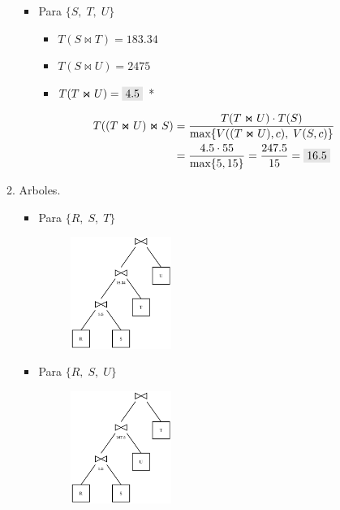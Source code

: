 \documentclass{templateNote}
\newcommand{\newparagraph}{\par\vspace{\baselineskip}\noindent}
\begin{document}
\begin{enumerate}
\begin{enumerate}[label=\arabic*)]
\begin{itemize}
            \item Para $\{S, \; T, \; U\}$
            \begin{itemize}
                \item $T(S \Join T) = 183.34$
                \item $T(S \Join U) = 2475$
                \item $T(T \Join U) = \colorbox{gray!20}{4.5}$ *
            \end{itemize}
            \begin{align*}
                T((T \Join U) \Join S) &= \displaystyle\frac{T(T \Join U) \cdot T(S)}{\text{max}\{V((T \Join U),c), \; V(S,c)\}} \\
                &= \frac{4.5 \cdot 55}{\text{max}\{5, 15\}} = \frac{247.5}{15} = \colorbox{gray!20}{16.5}
            \end{align*}
            \newparagraph
        \end{itemize}
        
        \item Arboles.
        \begin{itemize}
            \item Para $\{R, \; S, \; T\}$
            \begin{figure}[H]
                \centering
                \includegraphics[width=0.35\textwidth]{img/E4-A1.png}
            \end{figure}

            \newpage
            \item Para $\{R, \; S, \; U\}$
            \begin{figure}[H]
                \centering
                \includegraphics[width=0.35\textwidth]{img/E4-A2.png}
            \end{figure}


\end{itemize}
\end{enumerate}
\end{enumerate}
\end{document}
